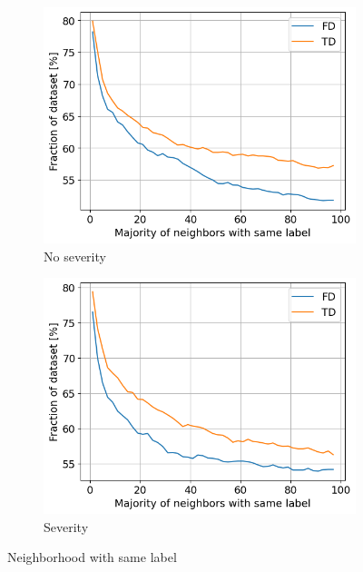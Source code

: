 \begin{figure}[h]
    \centering
    \begin{subfigure}[b]{0.49\textwidth}
        \includegraphics[width=\textwidth]{assets/results/all-features/neighborhood.png}
        \caption{No severity}
    \end{subfigure}
    \hfill
    \begin{subfigure}[b]{0.49\textwidth}
        \includegraphics[width=\textwidth]{assets/results/all-features/neighborhood-severity.png}
        \caption{Severity}
    \end{subfigure}
    \caption{Neighborhood with same label}
\end{figure}

